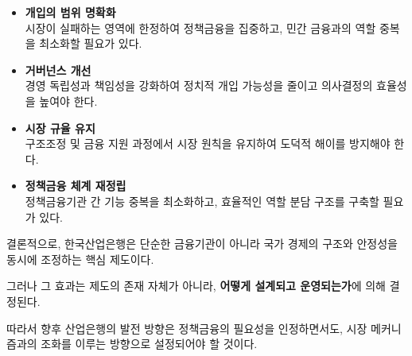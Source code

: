 \begin{itemize}
    \item \textbf{개입의 범위 명확화} \\
    시장이 실패하는 영역에 한정하여 정책금융을 집중하고, 민간 금융과의 역할 중복을 최소화할 필요가 있다.

    \item \textbf{거버넌스 개선} \\
    경영 독립성과 책임성을 강화하여 정치적 개입 가능성을 줄이고 의사결정의 효율성을 높여야 한다.

    \item \textbf{시장 규율 유지} \\
    구조조정 및 금융 지원 과정에서 시장 원칙을 유지하여 도덕적 해이를 방지해야 한다.

    \item \textbf{정책금융 체계 재정립} \\
    정책금융기관 간 기능 중복을 최소화하고, 효율적인 역할 분담 구조를 구축할 필요가 있다.
\end{itemize}

결론적으로, 한국산업은행은 단순한 금융기관이 아니라 국가 경제의 구조와 안정성을 동시에 조정하는 핵심 제도이다.

그러나 그 효과는 제도의 존재 자체가 아니라, \textbf{어떻게 설계되고 운영되는가}에 의해 결정된다.

따라서 향후 산업은행의 발전 방향은 정책금융의 필요성을 인정하면서도, 시장 메커니즘과의 조화를 이루는 방향으로 설정되어야 할 것이다.